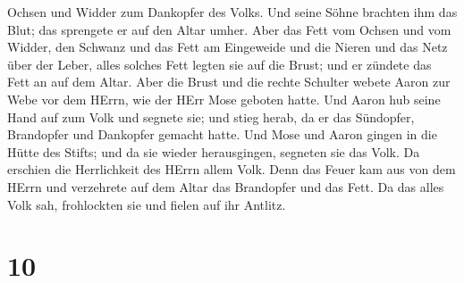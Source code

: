 Ochsen und Widder zum Dankopfer des Volks. Und seine Söhne brachten ihm
das Blut; das sprengete er auf den Altar umher.  Aber das
Fett vom Ochsen und vom Widder, den Schwanz und das Fett am Eingeweide
und die Nieren und das Netz über der Leber,  alles solches
Fett legten sie auf die Brust; und er zündete das Fett an auf dem Altar.
 Aber die Brust und die rechte Schulter webete Aaron zur
Webe vor dem HErrn, wie der HErr Mose geboten hatte.  Und
Aaron hub seine Hand auf zum Volk und segnete sie; und stieg herab, da
er das Sündopfer, Brandopfer und Dankopfer gemacht hatte. 
Und Mose und Aaron gingen in die Hütte des Stifts; und da sie wieder
herausgingen, segneten sie das Volk. Da erschien die Herrlichkeit des
HErrn allem Volk.  Denn das Feuer kam aus von dem HErrn und
verzehrete auf dem Altar das Brandopfer und das Fett. Da das alles Volk
sah, frohlockten sie und fielen auf ihr Antlitz.

\hypertarget{section-9}{%
\section{10}\label{section-9}}

